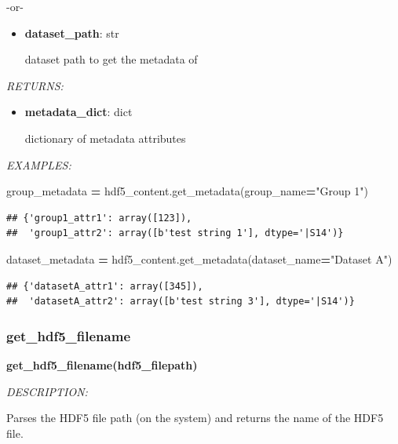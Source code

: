 \documentclass[
]{article}
\newenvironment{Shaded}{\begin{snugshade}}{\end{snugshade}}
\newcommand{\NormalTok}[1]{#1}
\newcommand{\OperatorTok}[1]{\textcolor[rgb]{0.81,0.36,0.00}{\textbf{#1}}}
\newcommand{\StringTok}[1]{\textcolor[rgb]{0.31,0.60,0.02}{#1}}
\begin{document}
-or-

\begin{itemize}
\item
  \textbf{dataset\_path}: str

  dataset path to get the metadata of
\end{itemize}

\emph{RETURNS:}

\begin{itemize}
\item
  \textbf{metadata\_dict}: dict

  dictionary of metadata attributes
\end{itemize}

\emph{EXAMPLES:}

\begin{Shaded}
\begin{Highlighting}[]
\NormalTok{group_metadata }\OperatorTok{=}\NormalTok{ hdf5_content.get_metadata(group_name}\OperatorTok{=}\StringTok{"Group 1"}\NormalTok{)}
\end{Highlighting}
\end{Shaded}

\begin{verbatim}
## {'group1_attr1': array([123]),
##  'group1_attr2': array([b'test string 1'], dtype='|S14')}
\end{verbatim}

\begin{Shaded}
\begin{Highlighting}[]
\NormalTok{dataset_metadata }\OperatorTok{=}\NormalTok{ hdf5_content.get_metadata(dataset_name}\OperatorTok{=}\StringTok{"Dataset A"}\NormalTok{)}
\end{Highlighting}
\end{Shaded}

\begin{verbatim}
## {'datasetA_attr1': array([345]),
##  'datasetA_attr2': array([b'test string 3'], dtype='|S14')}
\end{verbatim}

\hypertarget{get_hdf5_filename}{%
\subsubsection{get\_hdf5\_filename}\label{get_hdf5_filename}}

\textbf{get\_hdf5\_filename(hdf5\_filepath)}

\emph{DESCRIPTION:}

Parses the HDF5 file path (on the system) and returns the name of the HDF5 file.
\end{document}
